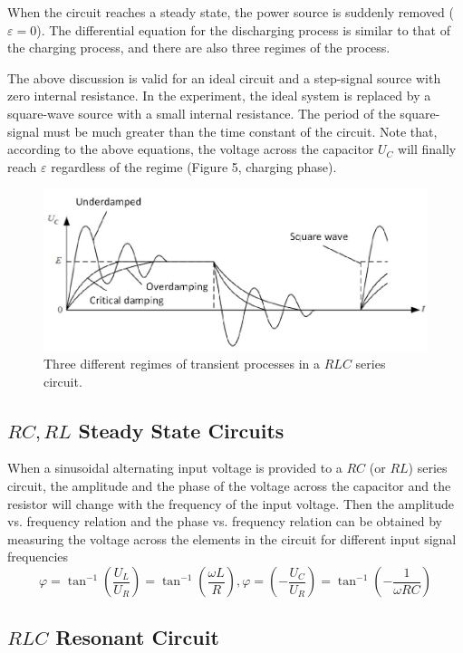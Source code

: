 \documentclass[12pt]{article}
\begin{document}
When the circuit reaches a steady state, the power source is suddenly removed ($\varepsilon=0$).
The differential equation for the discharging process is similar to that of the charging
process, and there are also three regimes of the process.
\par The above discussion is valid for an ideal circuit and a step-signal source with zero
internal resistance. In the experiment, the ideal system is replaced by a square-wave
source with a small internal resistance. The period of the square-signal must be much
greater than the time constant of the circuit. Note that, according to the above equations,
the voltage across the capacitor $U_C$ will finally reach $\varepsilon$ regardless of the regime (Figure
5, charging phase).
\begin{figure}[H]
\centering
\includegraphics[scale=0.4]{P3.jpg}
\caption{Three different regimes of transient processes in a $RLC$ series circuit.}
\end{figure}
\subsection{$RC,RL$ Steady State Circuits}
When a sinusoidal alternating input voltage is provided to a $RC$ (or $RL$) series circuit,
the amplitude and the phase of the voltage across the capacitor and the resistor will change
with the frequency of the input voltage. Then the amplitude vs. frequency relation and
the phase vs. frequency relation can be obtained by measuring the voltage across the
elements in the circuit for different input signal frequencies
$$\varphi=\tan^{-1}(\frac{U_L}{U_R})=\tan^{-1}(\frac{\omega L}{R}),\varphi=(-\frac{U_C}{U_R})=\tan^{-1}(-\frac{1}{\omega RC})$$
\subsection{$RLC$ Resonant Circuit}
\end{document}
